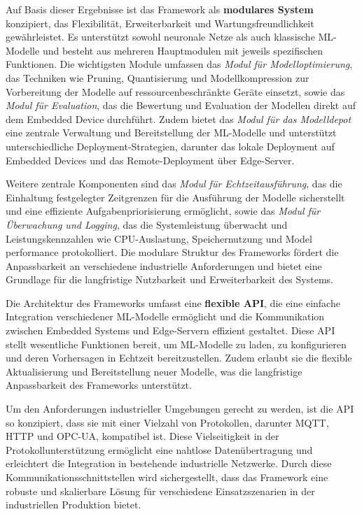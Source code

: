 Auf Basis dieser Ergebnisse ist das Framework als \textbf{modulares System} konzipiert, das Flexibilität, Erweiterbarkeit und Wartungsfreundlichkeit gewährleistet. 
Es unterstützt sowohl neuronale Netze als auch klassische ML-Modelle und besteht aus mehreren Hauptmodulen mit jeweils spezifischen Funktionen. Die wichtigsten Module 
umfassen das \textit{Modul für Modelloptimierung}, das Techniken wie Pruning, Quantisierung und Modellkompression zur Vorbereitung der Modelle auf ressourcenbeschränkte 
Geräte einsetzt, sowie das \textit{Modul für Evaluation}, das die Bewertung und Evaluation der Modellen direkt auf dem Embedded Device durchführt. 
Zudem bietet das \textit{Modul für das Modelldepot} eine zentrale Verwaltung und Bereitstellung der ML-Modelle und unterstützt unterschiedliche Deployment-Strategien, 
darunter das lokale Deployment auf Embedded Devices und das Remote-Deployment über Edge-Server.

Weitere zentrale Komponenten sind das \textit{Modul für Echtzeitausführung}, das die Einhaltung festgelegter Zeitgrenzen für die Ausführung der Modelle sicherstellt 
und eine effiziente Aufgabenpriorisierung ermöglicht, sowie das \textit{Modul für Überwachung und Logging}, das die Systemleistung überwacht und Leistungskennzahlen wie CPU-Auslastung, 
Speichernutzung und Model performance protokolliert. Die modulare Struktur des Frameworks fördert die Anpassbarkeit an verschiedene industrielle Anforderungen und bietet 
eine Grundlage für die langfristige Nutzbarkeit und Erweiterbarkeit des Systems.

Die Architektur des Frameworks umfasst eine \textbf{flexible API}, die eine einfache Integration verschiedener ML-Modelle ermöglicht und die Kommunikation zwischen Embedded Systems 
und Edge-Servern effizient gestaltet. Diese API stellt wesentliche Funktionen bereit, um ML-Modelle zu laden, zu konfigurieren und deren Vorhersagen in Echtzeit bereitzustellen. 
Zudem erlaubt sie die flexible Aktualisierung und Bereitstellung neuer Modelle, was die langfristige Anpassbarkeit des Frameworks unterstützt.

Um den Anforderungen industrieller Umgebungen gerecht zu werden, ist die API so konzipiert, dass sie mit einer Vielzahl von Protokollen, darunter MQTT, HTTP und OPC-UA, kompatibel ist. 
Diese Vielseitigkeit in der Protokollunterstützung ermöglicht eine nahtlose Datenübertragung und erleichtert die Integration in bestehende industrielle Netzwerke. 
Durch diese Kommunikationsschnittstellen wird sichergestellt, dass das Framework eine robuste und skalierbare Lösung für verschiedene Einsatzszenarien in der industriellen Produktion bietet.

